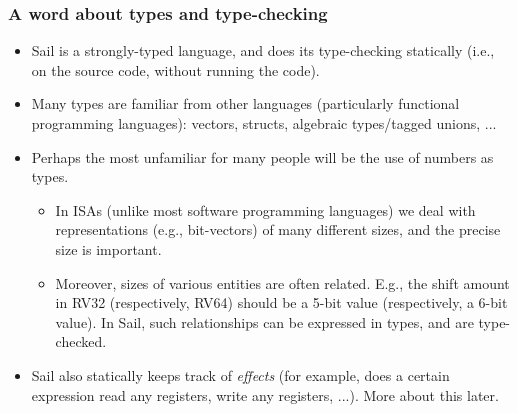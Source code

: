 \documentclass[aspectratio=169]{beamer}
\newcommand{\slidefont}{\scriptsize}
\begin{document}

\begin{frame}[fragile]
  \frametitle{A word about types and type-checking}

  
  \begin{itemize}\slidefont

    \item Sail is a strongly-typed language, and does its
      type-checking statically (i.e., on the source code, without
      running the code).

    \item Many types are familiar from other languages (particularly
      functional programming languages): vectors, structs, algebraic
      types/tagged unions, ...

    \item Perhaps the most unfamiliar for many people will be the use
      of numbers as types.

      \begin{itemize}\slidefont

        \item In ISAs (unlike most software programming languages) we
          deal with representations (e.g., bit-vectors) of many
          different sizes, and the precise size is important.

        \item Moreover, sizes of various entities are often related.
          E.g., the shift amount in RV32 (respectively, RV64) should
          be a 5-bit value (respectively, a 6-bit value).  In Sail,
          such relationships can be expressed in types, and are
          type-checked.

      \end{itemize}

    \item Sail also statically keeps track of \emph{effects} (for
      example, does a certain expression read any registers, write any
      registers, ...).  More about this later.

  \end{itemize}

\end{frame}

\end{document}
